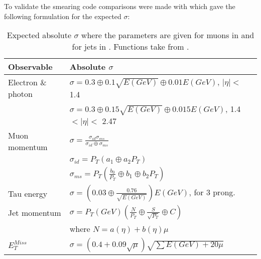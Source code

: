 To validate the smearing code comparisons were made with \citep{ATL-PHYS-PUB-2013-004} which gave the following formulation for the expected $\sigma$: 
\begin{table}[H]
\renewcommand{\arraystretch}{1.5} %
\begin{center}
\begin{tabular}{|l|l|}
\hline
Observable & Absolute $\sigma$ \\ \hline
Electron \& photon & $\sigma=0.3\oplus 0.1\sqrt{E(GeV)}\oplus 0.01E(GeV)$, $|\eta|<$ 1.4 \\
& $\sigma=0.3\oplus 0.15\sqrt{E(GeV)}\oplus 0.015E(GeV)$, 1.4 $<|\eta|<$ 2.47 \\ \hline 
Muon momentum& $\sigma=\frac{\sigma_{id} \sigma_{ms}}{\sigma_{id} \oplus \sigma_{ms}}$\\
& $\sigma_{id}=P_T(a_1 \oplus a_2 P_T)$\\
& $\sigma_{ms}=P_T(\frac{b_0}{P_T} \oplus b_1 \oplus b_2 P_T)$\\ \hline
Tau energy& $\sigma =(0.03\oplus \frac{0.76}{\sqrt{E(GeV)}})E(GeV)$, for 3 prong.\\ \hline
Jet momentum& $\sigma = P_T(GeV)(\frac{N}{P_T} \oplus \frac{S}{\sqrt{P_T}} \oplus C)$ \\ 
& where $N=a(\eta)+b(\eta)\mu$ \\ \hline
$E_T^{Miss}$ & $\sigma = (0.4+0.09\sqrt{\mu})\sqrt{\sum E(GeV)+20\mu}$ \\ \hline
\end{tabular}
\end{center}
\renewcommand{\arraystretch}{1.0} %
\caption{Expected absolute $\sigma$ where the parameters are given for muons in  and for jets in . Functions take from \citep{ATL-PHYS-PUB-2013-004}.}
\label{tab:expected sigma}
\end{table}

